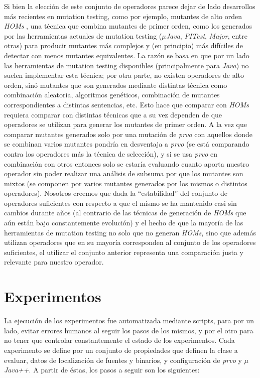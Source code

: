 Si bien la elecci\'on de este conjunto de operadores parece dejar de lado desarrollos m\'as recientes en mutation testing, como por ejemplo, mutantes de alto orden \emph{HOMs} \cite{bibliography.mutation.highorder.JiaH09}, una t\'ecnica que combina mutantes de primer orden, como los generados por las herramientas actuales de mutation testing (\emph{$\mu$Java}, \emph{PITest}, \emph{Major}, entre otras) para producir mutantes m\'as complejos y (en principio) m\'as dif\'iciles de detectar con menos mutantes equivalentes. La raz\'on se basa en que por un lado las herramientas de mutation testing disponibles (principalmente para \emph{Java}) no suelen implementar esta t\'ecnica; por otra parte, no existen operadores de alto orden, sin\'o mutantes que son generados mediante distintas t\'ecnica como combinaci\'on aleatoria, algoritmos gen\'eticos, combinaci\'on de mutantes correspondientes a distintas sentencias, etc. Esto hace que comparar con \emph{HOMs} requiera comparar con distintas t\'ecnicas que a su vez dependen de que operadores se utilizan para generar los mutantes de primer orden. A la vez que comparar mutantes generados solo por una mutaci\'on de \emph{prvo} con aquellos donde se combinan varios mutantes pondr\'ia en desventaja a \emph{prvo} (se est\'a comparando contra los operadores m\'as la t\'ecnica de selecci\'on), y si se usa \emph{prvo} en combinaci\'on con otros entonces solo se estar\'ia evaluando cuanto aporta nuestro operador sin poder realizar una an\'alisis de subsuma por que los mutantes son mixtos (se componen por varios mutantes generados por los mismos o distintos operadores). Nosotros creemos que dada la ``estabilidad'' del conjunto de operadores suficientes con respecto a que el mismo se ha mantenido casi sin cambios durante a\~nos (al contrario de las t\'ecnicas de generaci\'on de \emph{HOMs} que a\'un est\'an bajo constantemente evoluci\'on) y el hecho de que la mayor\'ia de las herramientas de mutation testing no solo que no generan \emph{HOMs}, sino que adem\'as utilizan operadores que en su mayor\'ia corresponden al conjunto de los operadores suficientes, el utilizar el conjunto anterior representa una comparaci\'on justa y relevante para nuestro operador.

\section{Experimentos}
\label{sec:evaluation.steps}

La ejecuci\'on de los experimentos fue automatizada mediante scripts, para por un lado, evitar errores humanos al seguir los pasos de los mismos, y por el otro para no tener que controlar constantemente el estado de los experimentos. Cada experimento se define por un conjunto de propiedades que definen la clase a evaluar, datos de localizaci\'on de fuentes y binarios, y configuraci\'on de \emph{prvo} y \emph{$\mu$Java++}. A partir de \'estas, los pasos a seguir son los siguientes:


